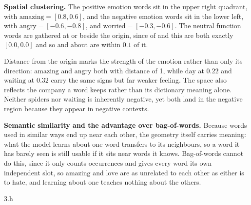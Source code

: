 \begin{answer}
  \textbf{Spatial clustering.} The positive emotion words sit in the upper right quadrant, with
  $\text{amazing} = [0.8, 0.6]$, and the negative emotion words sit
  in the lower left, with $\text{angry} = [-0.6, -0.8]$, and $\text{worried} = [-0.3, -0.6]$. The neutral function words
  are gathered at or beside the origin, since $\text{of}$ and $\text{this}$ are both exactly
  $[0.0, 0.0]$ and $\text{so}$ and $\text{about}$ are within $0.1$ of it.

  \medskip
  Distance from the origin marks the strength of the emotion rather than only its direction:
  $\text{amazing}$ and $\text{angry}$ both with distance of 1, while $\text{day}$ at $0.22$ and
  $\text{waiting}$ at $0.32$ carry the same signs but far weaker feeling. The space also reflects
  the company a word keeps rather than its dictionary meaning alone. Neither $\text{spiders}$ nor
  $\text{waiting}$ is inherently negative, yet both land in the negative region because they appear
  in negative contexts.

  \medskip
  \textbf{Semantic similarity and the advantage over bag-of-words.} Because words used in similar
  ways end up near each other, the geometry itself carries meaning: what the model learns about one
  word transfers to its neighbours, so a word it has barely seen is still usable if it sits near
  words it knows. Bag-of-words cannot do this, since it only counts occurrences and gives every
  word its own independent slot, so $\text{amazing}$ and $\text{love}$ are as unrelated to each
  other as either is to $\text{hate}$, and learning about one teaches nothing about the others.
\end{answer}

\clearpage

\LARGE
3.h
\normalsize


